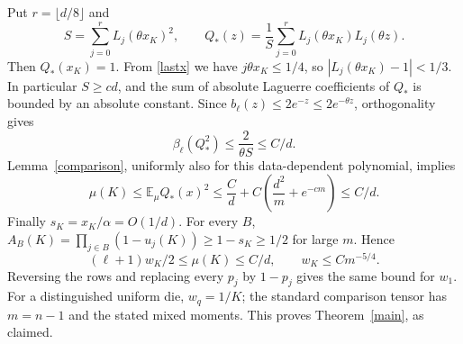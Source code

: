 \documentclass[11pt]{article}
\newcommand{\E}{\mathbb E}
\begin{document}
Put $r=\lfloor d/8\rfloor$ and
\[
 S=\sum_{j=0}^{r}L_j(\theta x_K)^2,
 \qquad Q_*(z)=\frac1S\sum_{j=0}^{r}
              L_j(\theta x_K)L_j(\theta z).
\]
Then $Q_*(x_K)=1$. From \eqref{lastx} we have
$j\theta x_K\le1/4$, so $|L_j(\theta x_K)-1|<1/3$.
In particular $S\ge c d$, and the sum of absolute Laguerre
coefficients of $Q_*$ is bounded by an absolute constant.
Since $b_\ell(z)\le2e^{-z}\le2e^{-\theta z}$,
orthogonality gives
\[
 \beta_\ell(Q_*^2)\le\frac2{\theta S}\le C/d.
\]
Lemma~\ref{comparison}, uniformly also for this data-dependent
polynomial, implies
\[
 \mu(K)\le\E_\mu Q_*(x)^2
 \le \frac Cd+C\left(\frac{d^2}{m}+e^{-cm}\right)
 \le C/d.
\]
Finally $s_K=x_K/\alpha=O(1/d)$. For every $B$,
$A_B(K)=\prod_{j\in B}(1-u_j(K))\ge1-s_K\ge1/2$ for large $m$.
Hence
\[
 (\ell+1)w_K/2\le\mu(K)\le C/d,
 \qquad w_K\le C m^{-5/4}.
\]
Reversing the rows and replacing every $p_j$ by $1-p_j$ gives the
same bound for $w_1$. For a distinguished uniform die, $w_q=1/K$;
the standard comparison tensor has $m=n-1$ and the stated mixed moments.
This proves Theorem~\ref{main}, as claimed.
\end{document}
